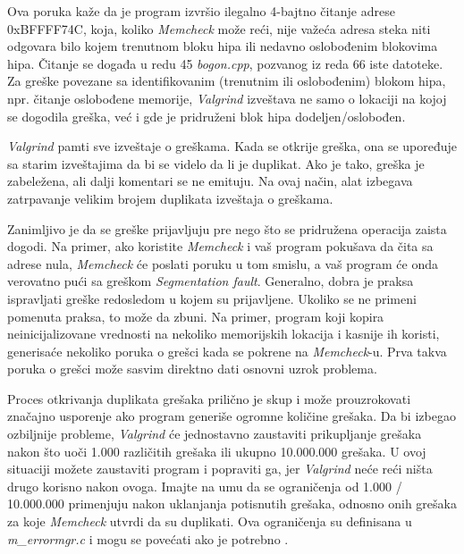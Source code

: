 \documentclass[12pt,oneside]{memoir}
\theoremstyle{plain}
\theoremstyle{definition}
\begin{document}
Ova poruka kaže da je program izvršio ilegalno 4-bajtno čitanje adrese 0xBFFFF74C, koja, koliko \textit{Memcheck} može reći, nije važeća adresa steka niti odgovara bilo kojem trenutnom bloku hipa ili nedavno oslobođenim blokovima hipa. Čitanje se događa u redu 45 \textit{bogon.cpp}, pozvanog iz reda 66 iste datoteke. Za greške povezane sa identifikovanim (trenutnim ili oslobođenim) blokom hipa, npr. čitanje oslobođene memorije, \textit{Valgrind} izveštava ne samo o lokaciji na kojoj se dogodila greška, već i gde je pridruženi blok hipa dodeljen/oslobođen.

\textit{Valgrind} pamti sve izveštaje o greškama. Kada se otkrije greška, ona se upoređuje sa starim izveštajima da bi se videlo da li je duplikat. Ako je tako, greška je zabeležena, ali dalji komentari se ne emituju. Na ovaj način, alat izbegava zatrpavanje velikim brojem duplikata izveštaja o greškama.  

Zanimljivo je da se greške prijavljuju pre nego što se pridružena operacija zaista dogodi. Na primer, ako koristite \textit{Memcheck} i vaš program pokušava da čita sa adrese nula, \textit{Memcheck} će poslati poruku u tom smislu, a vaš program će onda verovatno pući sa greškom \textit{Segmentation fault}. Generalno, dobra je praksa ispravljati greške redosledom u kojem su prijavljene. Ukoliko se ne primeni pomenuta praksa, to može da zbuni. Na primer, program koji kopira neinicijalizovane vrednosti na nekoliko memorijskih lokacija i kasnije ih koristi, generisaće nekoliko poruka o grešci kada se pokrene na \textit{Memcheck}-u. Prva takva poruka o grešci može sasvim direktno dati osnovni uzrok problema. 

Proces otkrivanja duplikata grešaka prilično je skup i može prouzrokovati značajno usporenje ako program generiše ogromne količine grešaka. Da bi izbegao ozbiljnije probleme, \textit{Valgrind} će jednostavno zaustaviti prikupljanje grešaka nakon što uoči 1.000 različitih grešaka ili ukupno 10.000.000 grešaka. U ovoj situaciji možete zaustaviti program i popraviti ga, jer \textit{Valgrind} neće reći ništa drugo korisno nakon ovoga. Imajte na umu da se ograničenja od 1.000 / 10.000.000 primenjuju nakon uklanjanja potisnutih grešaka, odnosno onih grešaka za koje \textit{Memcheck} utvrdi da su duplikati. Ova ograničenja su definisana u \textit{m\_errormgr.c} i mogu se povećati ako je potrebno \cite{ValgrindCore}. 
\end{document}
